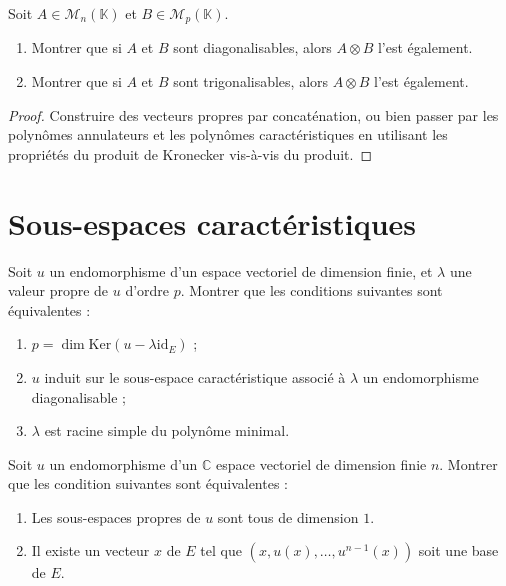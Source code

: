 \documentclass[french,a4paper]{article}
\newcommand{\C}{\mathbb{C}}
\newcommand{\K}{\mathbb{K}}
\renewcommand{\ker}{\text{Ker}}
\theoremstyle{plain}
\theoremstyle{definition}
\theoremstyle{remark}
\begin{document}
\begin{ex}{}
	Soit $A\in\mathcal{M}_n(\K)$ et $B\in\mathcal{M}_p(\K)$. 
	\begin{enumerate}
		\item Montrer que si $A$ et $B$ sont diagonalisables, alors $A\otimes B$ l'est également.
		\item Montrer que si $A$ et $B$ sont trigonalisables, alors $A\otimes B$ l'est également.
	\end{enumerate}
\end{ex}
\begin{proof}
	Construire des vecteurs propres par concaténation, ou bien passer par les polynômes annulateurs et les polynômes caractéristiques en utilisant les propriétés du produit de Kronecker vis-à-vis du produit.
\end{proof}

\section{Sous-espaces caractéristiques}

\begin{ex}{}
	Soit $u$ un endomorphisme d'un espace vectoriel de dimension finie, et $\lambda$ une valeur propre de $u$ d'ordre $p$. Montrer que les conditions suivantes sont équivalentes :
	\begin{enumerate}[label=(\roman*)]
		\item $p=\dim\ker(u-\lambda\text{id}_E)$ ;
		\item $u$ induit sur le sous-espace caractéristique associé à $\lambda$ un endomorphisme diagonalisable ;
		\item $\lambda$ est racine simple du polynôme minimal.
	\end{enumerate}
\end{ex}

\begin{ex}{}
	Soit $u$ un endomorphisme d'un $\C$ espace vectoriel de dimension finie $n$. Montrer que les condition suivantes sont équivalentes :
	\begin{enumerate}[label=(\roman*)]
		\item Les sous-espaces propres de $u$ sont tous de dimension $1$.
		\item Il existe un vecteur $x$ de $E$ tel que $(x,u(x),\ldots,u^{n-1}(x))$ soit une base de $E$.
	\end{enumerate}
\end{ex}
\end{document}
